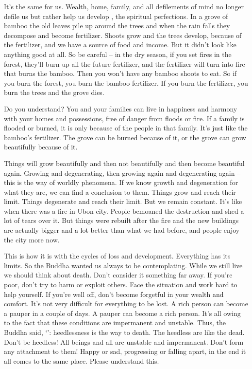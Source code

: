 It's the same for us. Wealth, home, family, and all defilements of mind no longer defile us but rather help us develop , the spiritual perfections. In a grove of bamboo the old leaves pile up around the trees and when the rain falls they decompose and become fertilizer. Shoots grow and the trees develop, because of the fertilizer, and we have a source of food and income. But it didn't look like anything good at all. So be careful -- in the dry season, if you set fires in the forest, they'll burn up all the future fertilizer, and the fertilizer will turn into fire that burns the bamboo. Then you won't have any bamboo shoots to eat. So if you burn the forest, you burn the bamboo fertilizer. If you burn the fertilizer, you burn the trees and the grove dies. 

Do you understand? You and your families can live in happiness and harmony with your homes and possessions, free of danger from floods or fire. If a family is flooded or burned, it is only because of the people in that family. It's just like the bamboo's fertilizer. The grove can be burned because of it, or the grove can grow beautifully because of it. 

Things will grow beautifully and then not beautifully and then become beautiful again. Growing and degenerating, then growing again and degenerating again -- this is the way of worldly phenomena. If we know growth and degeneration for what they are, we can find a conclusion to them. Things grow and reach their limit. Things degenerate and reach their limit. But we remain constant. It's like when there was a fire in Ubon city. People bemoaned the destruction and shed a lot of tears over it. But things were rebuilt after the fire and the new buildings are actually bigger and a lot better than what we had before, and people enjoy the city more now. 

This is how it is with the cycles of loss and development. Everything has its limits. So the Buddha wanted us always to be  contemplating. While we still live we should think about death. Don't consider it something far away. If you're poor, don't try to harm or exploit others. Face the situation and work hard to help yourself. If you're well off, don't become forgetful in your wealth and comfort. It's not very difficult for everything to be lost. A rich person can become a pauper in a couple of days. A pauper can become a rich person. It's all owing to the fact that these conditions are impermanent and unstable. Thus, the Buddha said, `': heedlessness is the way to death. The heedless are like the dead. Don't be heedless! All beings and all  are unstable and impermanent. Don't form any attachment to them! Happy or sad, progressing or falling apart, in the end it all comes to the same place. Please understand this. 

